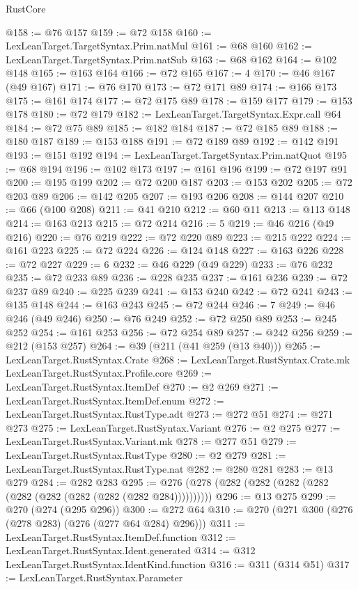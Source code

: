 \begin{lexlean}{RustCore}
\begin{coremodule}
@158 := @76 @157
@159 := @72 @158
@160 := LexLeanTarget.TargetSyntax.Prim.natMul
@161 := @68 @160
@162 := LexLeanTarget.TargetSyntax.Prim.natSub
@163 := @68 @162
@164 := @102 @148
@165 := @163 @164
@166 := @72 @165
@167 := 4
@170 := @46 @167 (@49 @167)
@171 := @76 @170
@173 := @72 @171 @89
@174 := @166 @173
@175 := @161 @174
@177 := @72 @175 @89
@178 := @159 @177
@179 := @153 @178
@180 := @72 @179
@182 := LexLeanTarget.TargetSyntax.Expr.call @64
@184 := @72 @75 @89
@185 := @182 @184
@187 := @72 @185 @89
@188 := @180 @187
@189 := @153 @188
@191 := @72 @189 @89
@192 := @142 @191
@193 := @151 @192
@194 := LexLeanTarget.TargetSyntax.Prim.natQuot
@195 := @68 @194
@196 := @102 @173
@197 := @161 @196
@199 := @72 @197 @91
@200 := @195 @199
@202 := @72 @200 @187
@203 := @153 @202
@205 := @72 @203 @89
@206 := @142 @205
@207 := @193 @206
@208 := @144 @207
@210 := @66 (@100 @208)
@211 := @41 @210
@212 := @60 @11
@213 := @113 @148
@214 := @163 @213
@215 := @72 @214
@216 := 5
@219 := @46 @216 (@49 @216)
@220 := @76 @219
@222 := @72 @220 @89
@223 := @215 @222
@224 := @161 @223
@225 := @72 @224
@226 := @124 @148
@227 := @163 @226
@228 := @72 @227
@229 := 6
@232 := @46 @229 (@49 @229)
@233 := @76 @232
@235 := @72 @233 @89
@236 := @228 @235
@237 := @161 @236
@239 := @72 @237 @89
@240 := @225 @239
@241 := @153 @240
@242 := @72 @241
@243 := @135 @148
@244 := @163 @243
@245 := @72 @244
@246 := 7
@249 := @46 @246 (@49 @246)
@250 := @76 @249
@252 := @72 @250 @89
@253 := @245 @252
@254 := @161 @253
@256 := @72 @254 @89
@257 := @242 @256
@259 := @212 (@153 @257)
@264 := @39 (@211 (@41 @259 (@13 @40)))
@265 := LexLeanTarget.RustSyntax.Crate
@268 := LexLeanTarget.RustSyntax.Crate.mk LexLeanTarget.RustSyntax.Profile.core
@269 := LexLeanTarget.RustSyntax.ItemDef
@270 := @2 @269
@271 := LexLeanTarget.RustSyntax.ItemDef.enum
@272 := LexLeanTarget.RustSyntax.RustType.adt
@273 := @272 @51
@274 := @271 @273
@275 := LexLeanTarget.RustSyntax.Variant
@276 := @2 @275
@277 := LexLeanTarget.RustSyntax.Variant.mk
@278 := @277 @51
@279 := LexLeanTarget.RustSyntax.RustType
@280 := @2 @279
@281 := LexLeanTarget.RustSyntax.RustType.nat
@282 := @280 @281
@283 := @13 @279
@284 := @282 @283
@295 := @276 (@278 (@282 (@282 (@282 (@282 (@282 (@282 (@282 (@282 (@282 @284))))))))))
@296 := @13 @275
@299 := @270 (@274 (@295 @296))
@300 := @272 @64
@310 := @270 (@271 @300 (@276 (@278 @283) (@276 (@277 @64 @284) @296)))
@311 := LexLeanTarget.RustSyntax.ItemDef.function
@312 := LexLeanTarget.RustSyntax.Ident.generated
@314 := @312 LexLeanTarget.RustSyntax.IdentKind.function
@316 := @311 (@314 @51)
@317 := LexLeanTarget.RustSyntax.Parameter

\end{coremodule}
\end{lexlean}
